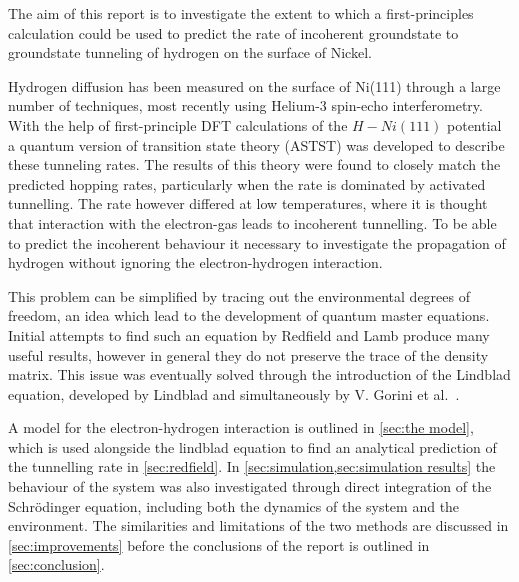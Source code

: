 

The aim of this report is to
investigate the extent to which
a first-principles calculation
could be used to predict the rate of
incoherent groundstate to
groundstate tunneling of hydrogen
on the surface of Nickel.

Hydrogen diffusion has been measured
on the surface of Ni(111) %
through a large number of
techniques\cite{LIN199141, Ni_Diffusion_Experement},
most recently
using Helium-3 spin-echo
interferometry\cite{Helium_spin_echo}.
With the help of first-principle DFT calculations of
the \(H-Ni(111)\) potential a
quantum version of transition state theory (ASTST)
was developed to describe these tunneling rates\cite{Jianding-Zhu}.
The results of this theory
were found to closely
match the predicted
hopping rates, particularly
when the rate is dominated
by activated tunnelling\cite{Jianding-Zhu}.
The rate however differed at low temperatures,
where it is thought that interaction with the
electron-gas leads to incoherent tunnelling.
To be able to predict the incoherent behaviour
it necessary to investigate
the propagation of hydrogen
without ignoring the electron-hydrogen
interaction.


This problem can be
simplified by tracing out the
environmental degrees of
freedom, an idea which lead to the
development of quantum master
equations. Initial
attempts to find such an
equation by Redfield\cite{REDFIELD19651}
and Lamb\cite{PhysRev.134.A1429} produce
many useful results, however in
general they do not preserve the
trace of the density matrix\cite{Chru_ci_ski_2017}. This
issue was eventually solved through
the introduction of the
Lindblad equation, developed
by Lindblad\cite{Lindblad1976}
and simultaneously
by V. Gorini et al.~\cite{doi:10.1063/1.522979}.



A model for the electron-hydrogen
interaction is outlined in
\cref{sec:the model},
which is used
alongside the
lindblad equation
to find an analytical prediction
of the tunnelling rate
in \cref{sec:redfield}.
In
\cref{sec:simulation,sec:simulation results}
the behaviour of the
system was also
investigated
through direct integration
of the
Schrödinger equation,
including both the dynamics
of the system and the environment.
The similarities and
limitations of the two
methods are discussed
in \cref{sec:improvements}
before the conclusions of
the report is
outlined in \cref{sec:conclusion}.




